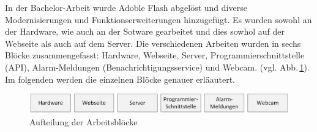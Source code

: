 \noindent
In der Bachelor-Arbeit wurde Adoble Flash abgelöst und diverse Modernisierungen und Funktionserweiterungen hinzugefügt. Es wurden sowohl an der Hardware, wie auch an der Sotware gearbeitet und dies sowhol auf der Webseite als auch auf dem Server. Die verschiedenen Arbeiten wurden in sechs Blöcke zusammengefasst: Hardware, Webseite, Server, Programmierschnittstelle (API), Alarm-Meldungen (Benachrichtigungsservice) und Webcam. (vgl. Abb.\,\ref{img:module}). Im folgenden werden die einzelnen Blöcke genauer erläautert.

\vspace{5mm} %

\begin{figure}[htbp!]
	\centering
	\includegraphics[width=1\linewidth]{img/module}
	\caption{Aufteilung der Arbeitsblöcke}
	\label{img:module}
\end{figure}


\newpage

